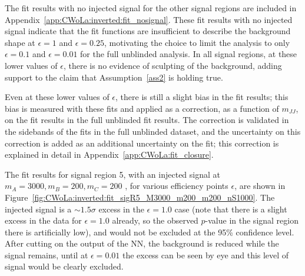 The fit results with no injected signal for the other signal regions are included in Appendix~\ref{app:CWoLa:inverted:fit_nosignal}.
These fit results with no injected signal indicate that the fit functions are insufficient to describe the background shape at $\epsilon=1$ and $\epsilon=0.25$, motivating the choice to limit the analysis to only $\epsilon=0.1$ and $\epsilon=0.01$ for the full unblinded analysis.
In all signal regions, at these lower values of $\epsilon$, there is no evidence of sculpting of the background, adding support to the claim that Assumption~\ref{ass2} is holding true.

Even at these lower values of $\epsilon$, there is still a slight bias in the fit results; this bias is measured with these fits and applied as a correction, as a function of $m_{JJ}$, on the fit results in the full unblinded fit results.
The correction is validated in the sidebands of the fits in the full unblinded dataset, and the uncertainty on this correction is added as an additional uncertainty on the fit;
this correction is explained in detail in Appendix~\ref{app:CWoLa:fit_closure}.

The fit results for signal region 5, with an injected signal at $m_A=3000,m_B=200,m_C=200$ \GeV, for various efficiency points $\epsilon$, are shown in Figure~\ref{fig:CWoLa:inverted:fit_sigR5_M3000_m200_m200_nS1000}.
The injected signal is a $\sim 1.5\sigma$ excess in the $\epsilon=1.0$ case (note that there is a slight excess in the data for $\epsilon=1.0$ already, so the observed $p$-value in the signal region there is artificially low), and would not be excluded at the 95\% confidence level.
After cutting on the output of the NN, the background is reduced while the signal remains, until at $\epsilon=0.01$ the excess can be seen by eye and this level of signal would be clearly excluded.


